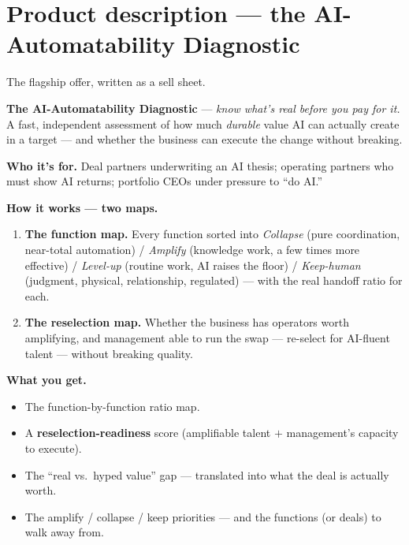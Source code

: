 \documentclass[11pt]{article}
\begin{document}
\section{Product description --- the AI-Automatability Diagnostic}
The flagship offer, written as a sell sheet.

\begin{callout}
\textbf{The AI-Automatability Diagnostic} --- \emph{know what's real before you pay for it.}\\[2pt]
A fast, independent assessment of how much \emph{durable} value AI can actually create in a
target --- and whether the business can execute the change without breaking.
\end{callout}

\textbf{Who it's for.} Deal partners underwriting an AI thesis; operating partners who must show
AI returns; portfolio CEOs under pressure to ``do AI.''

\textbf{How it works --- two maps.}
\begin{enumerate}
  \item \textbf{The function map.} Every function sorted into \emph{Collapse} (pure coordination,
  near-total automation) / \emph{Amplify} (knowledge work, a few times more effective) /
  \emph{Level-up} (routine work, AI raises the floor) / \emph{Keep-human} (judgment, physical,
  relationship, regulated) --- with the real handoff ratio for each.
  \item \textbf{The reselection map.} Whether the business has operators worth amplifying, and
  management able to run the swap --- re-select for AI-fluent talent --- without breaking quality.
\end{enumerate}

\textbf{What you get.}
\begin{itemize}
  \item The function-by-function ratio map.
  \item A \textbf{reselection-readiness} score (amplifiable talent $+$ management's capacity to execute).
  \item The ``real vs.\ hyped value'' gap --- translated into what the deal is actually worth.
  \item The amplify / collapse / keep priorities --- and the functions (or deals) to walk away from.
\end{itemize}
\end{document}
